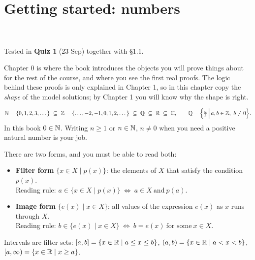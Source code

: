 \setcounter{chapter}{-1}
\chapter{Getting started: numbers}
%
{\\ \\ Tested in \textbf{Quiz 1} (23 Sep) together with \S1.1.}

Chapter 0 is where the book introduces the objects you will prove things about for the rest of the course, and where you see the first real proofs. The logic behind these proofs is only explained in Chapter 1, so in this chapter copy the \emph{shape} of the model solutions; by Chapter 1 you will know why the shape is right.


\begin{key}
\[
\N=\{0,1,2,3,\dots\}\ \subseteq\ \Z=\{\dots,-2,-1,0,1,2,\dots\}\ \subseteq\ \Q\ \subseteq\ \R\ \subseteq\ \C,
\qquad \Q=\Big\{\tfrac{a}{b}\,\Big|\,a,b\in\Z,\ b\neq0\Big\}.
\]
In this book $0\in\mathbb{N}$. Writing $n\ge1$ or $n\in\mathbb{N}$, $n\neq0$ when you need a positive natural number is your job.
\end{key}

\begin{key}
There are two forms, and you must be able to read both:
\begin{itemize}
\item \textbf{Filter form} $\{x\in X\mid p(x)\}$: the elements of $X$ that satisfy the condition $p(x)$. \\
  Reading rule: \quad $a\in\{x\in X\mid p(x)\}\ \Leftrightarrow\ a\in X\ \text{and}\ p(a)$.
\item \textbf{Image form} $\{e(x)\mid x\in X\}$: all values of the expression $e(x)$ as $x$ runs through $X$.\\
  Reading rule: \quad $b\in\{e(x)\mid x\in X\}\ \Leftrightarrow\ b=e(x)\ \text{for some}\ x\in X$.
\end{itemize}
Intervals are filter sets: $[a,b]=\{x\in\mathbb{R}\mid a\le x\le b\}$, $(a,b)=\{x\in\mathbb{R}\mid a<x<b\}$, $[a,\infty)=\{x\in\mathbb{R}\mid x\ge a\}$.
\end{key}

